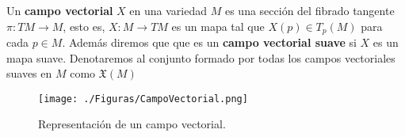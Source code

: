 \begin{frame}
\begin{definition}
  Un \textbf{campo vectorial} $X$ en una variedad $M$ es una sección del fibrado tangente $\pi: TM \to M$, esto es, $X: M \to TM$ es un mapa tal que $X(p) \in T_{p}(M)$ para cada $p \in M$. Además diremos que que es un \textbf{campo vectorial suave} si $X$ es un mapa suave. Denotaremos al conjunto formado por todas los campos vectoriales suaves en $M$ como $\mathfrak{X}(M)$
\end{definition}
\end{frame}

\begin{frame}
  \centering
  \begin{figure}
  \texttt{[image: ./Figuras/CampoVectorial.png]}
    \caption{Representación de un campo vectorial.}
  \end{figure}
\end{frame}
